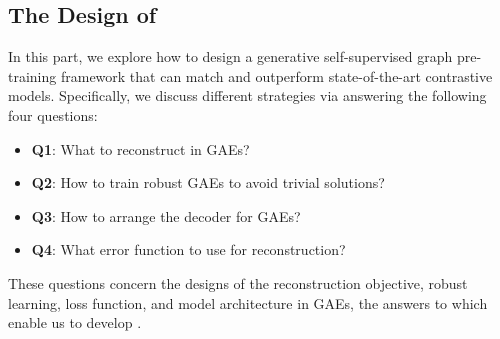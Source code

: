  







\subsection{The   Design of \model}

In this part, we explore how to design a generative self-supervised graph pre-training framework 
that can match and outperform state-of-the-art contrastive models. 
Specifically, we discuss different strategies via answering the following four questions: 
\begin{itemize}[leftmargin=*,itemsep=0pt,parsep=0.2em,topsep=0.3em,partopsep=0.3em]
    \item \textbf{Q1}: What to reconstruct in GAEs? %
    \item \textbf{Q2}: How to train robust GAEs to avoid trivial solutions? 
    \item \textbf{Q3}: How to arrange the decoder for GAEs?
    \item \textbf{Q4}: What error function to use for reconstruction?
\end{itemize}
These questions concern the designs of the reconstruction objective, robust learning, loss function, and model architecture in GAEs, the answers to which enable us to develop \model. 




